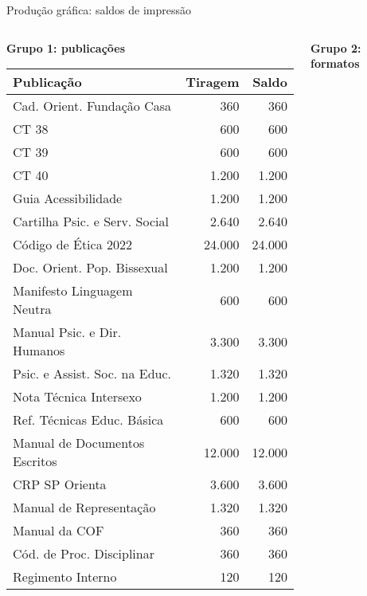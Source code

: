 \documentclass{beamer}
\begin{document}
\begin{frame}{Produção gráfica: saldos de impressão}
	\begin{columns}[T]
		\begin{column}{0.48\textwidth}
			{\small\textbf{Grupo 1: publicações}}
			\vspace{0.2cm}

			{\tiny
			\begin{tabular}{p{}rr}
				\hline
				\textbf{Publicação} & \textbf{Tiragem} & \textbf{Saldo} \\
				\hline
				Cad. Orient. Fundação Casa & 360 & 360 \\
				CT 38 & 600 & 600 \\
				CT 39 & 600 & 600 \\
				CT 40 & 1.200 & 1.200 \\
				Guia Acessibilidade & 1.200 & 1.200 \\
				Cartilha Psic. e Serv. Social & 2.640 & 2.640 \\
				Código de Ética 2022 & 24.000 & 24.000 \\
				Doc. Orient. Pop. Bissexual & 1.200 & 1.200 \\
				Manifesto Linguagem Neutra & 600 & 600 \\
				Manual Psic. e Dir. Humanos & 3.300 & 3.300 \\
				Psic. e Assist. Soc. na Educ. & 1.320 & 1.320 \\
				Nota Técnica Intersexo & 1.200 & 1.200 \\
				Ref. Técnicas Educ. Básica & 600 & 600 \\
				Manual de Documentos Escritos & 12.000 & 12.000 \\
				CRP SP Orienta & 3.600 & 3.600 \\
				Manual de Representação & 1.320 & 1.320 \\
				Manual da COF & 360 & 360 \\
				Cód. de Proc. Disciplinar & 360 & 360 \\
				Regimento Interno & 120 & 120 \\
				\hline
			\end{tabular}}
		\end{column}

		\begin{column}{0.48\textwidth}
			{\small\textbf{Grupo 2: formatos}}
			\vspace{0.2cm}


\end{column}
\end{columns}
\end{frame}
\end{document}
